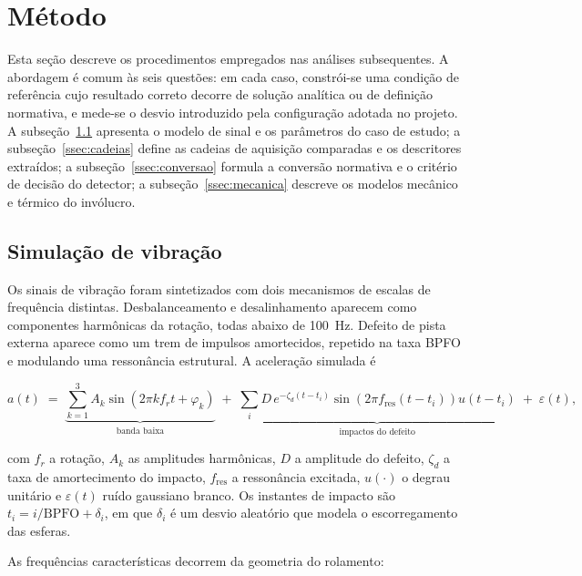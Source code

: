 \documentclass[11pt,a4paper]{article}
\begin{document}
\section{Método}

Esta seção descreve os procedimentos empregados nas análises subsequentes. A abordagem é
comum às seis questões: em cada caso, constrói-se uma condição de referência cujo
resultado correto decorre de solução analítica ou de definição normativa, e mede-se o
desvio introduzido pela configuração adotada no projeto. A subseção~\ref{ssec:sinal}
apresenta o modelo de sinal e os parâmetros do caso de estudo; a
subseção~\ref{ssec:cadeias} define as cadeias de aquisição comparadas e os descritores
extraídos; a subseção~\ref{ssec:conversao} formula a conversão normativa e o critério de
decisão do detector; a subseção~\ref{ssec:mecanica} descreve os modelos mecânico e
térmico do invólucro.

\subsection{Simulação de vibração}
\label{ssec:sinal}

Os sinais de vibração foram sintetizados com dois mecanismos de escalas de frequência
distintas. Desbalanceamento e desalinhamento aparecem como componentes harmônicas da
rotação, todas abaixo de \SI{100}{\hertz}. Defeito de pista externa aparece como um trem
de impulsos amortecidos, repetido na taxa BPFO e modulando uma ressonância estrutural. A
aceleração simulada é

\begin{equation}
a(t) \;=\; \underbrace{\sum_{k=1}^{3} A_k \sin\!\left(2\pi k f_r t + \varphi_k\right)}_{\text{banda baixa}}
\;+\; \underbrace{\sum_{i} D\, e^{-\zeta_d (t-t_i)} \sin\!\left(2\pi f_{\mathrm{res}} (t-t_i)\right) u(t-t_i)}_{\text{impactos do defeito}}
\;+\; \varepsilon(t),
\label{eq:sinal}
\end{equation}

\noindent
com $f_r$ a rotação, $A_k$ as amplitudes harmônicas, $D$ a amplitude do defeito,
$\zeta_d$ a taxa de amortecimento do impacto, $f_{\mathrm{res}}$ a ressonância excitada,
$u(\cdot)$ o degrau unitário e $\varepsilon(t)$ ruído gaussiano branco. Os instantes de
impacto são $t_i = i/\mathrm{BPFO} + \delta_i$, em que $\delta_i$ é um desvio aleatório
que modela o escorregamento das esferas.

As frequências características decorrem da geometria do rolamento:
\end{document}

